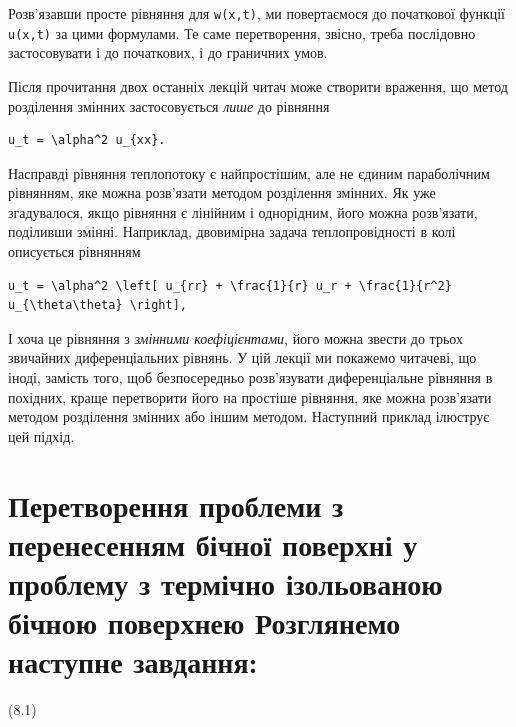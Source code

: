 \documentclass[
  ukrainian,
]{article}
\begin{document}
Розв'язавши просте рівняння для \texttt{w(x,t)}, ми повертаємося до
початкової функції \texttt{u(x,t)} за цими формулами. Те саме
перетворення, звісно, треба послідовно застосовувати і до початкових, і
до граничних умов.

Після прочитання двох останніх лекцій читач може створити враження, що
метод розділення змінних застосовується \emph{лише} до рівняння

\begin{verbatim}
u_t = \alpha^2 u_{xx}.
\end{verbatim}

Насправді рівняння теплопотоку є найпростішим, але не єдиним
параболічним рівнянням, яке можна розв'язати методом розділення змінних.
Як уже згадувалося, якщо рівняння є лінійним і однорідним, його можна
розв'язати, поділивши змінні. Наприклад, двовимірна задача
теплопровідності в колі описується рівнянням

\begin{verbatim}
u_t = \alpha^2 \left[ u_{rr} + \frac{1}{r} u_r + \frac{1}{r^2} u_{\theta\theta} \right],
\end{verbatim}

І хоча це рівняння з \emph{змінними коефіцієнтами}, його можна звести до
трьох звичайних диференціальних рівнянь. У цій лекції ми покажемо
читачеві, що іноді, замість того, щоб безпосередньо розв'язувати
диференціальне рівняння в похідних, краще перетворити його на простіше
рівняння, яке можна розв'язати методом розділення змінних або іншим
методом. Наступний приклад ілюструє цей підхід.

\section{Перетворення проблеми з перенесенням бічної поверхні у проблему
з термічно ізольованою бічною поверхнею Розглянемо наступне
завдання:}\label{ux43fux435ux440ux435ux442ux432ux43eux440ux435ux43dux43dux44f-ux43fux440ux43eux431ux43bux435ux43cux438-ux437-ux43fux435ux440ux435ux43dux435ux441ux435ux43dux43dux44fux43c-ux431ux456ux447ux43dux43eux457-ux43fux43eux432ux435ux440ux445ux43dux456-ux443-ux43fux440ux43eux431ux43bux435ux43cux443-ux437-ux442ux435ux440ux43cux456ux447ux43dux43e-ux456ux437ux43eux43bux44cux43eux432ux430ux43dux43eux44e-ux431ux456ux447ux43dux43eux44e-ux43fux43eux432ux435ux440ux445ux43dux435ux44e-ux440ux43eux437ux433ux43bux44fux43dux435ux43cux43e-ux43dux430ux441ux442ux443ux43fux43dux435-ux437ux430ux432ux434ux430ux43dux43dux44f}

(8.1)
\end{document}
